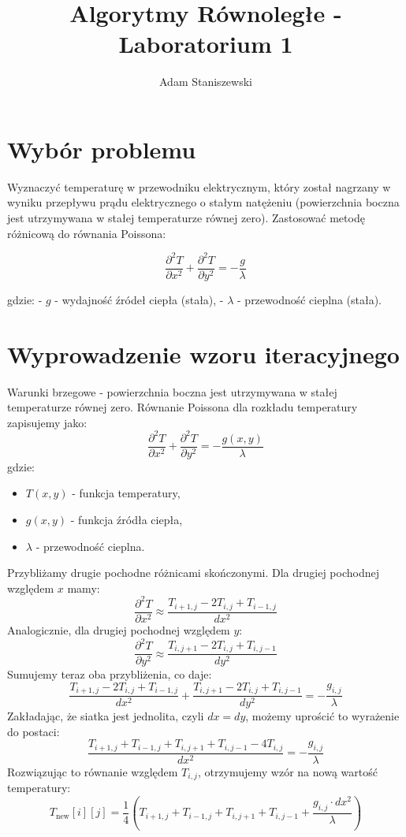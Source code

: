 \documentclass{article}
\title{Algorytmy Równoległe - Laboratorium 1}
\author{Adam Staniszewski}
\begin{document}
\maketitle

\section*{Wybór problemu}
Wyznaczyć temperaturę w przewodniku elektrycznym, który został nagrzany w wyniku przepływu prądu elektrycznego o stałym natężeniu (powierzchnia boczna jest utrzymywana w stałej temperaturze równej zero).
Zastosować metodę różnicową do równania Poissona:

\[
\frac{\partial^2 T}{\partial x^2} + \frac{\partial^2 T}{\partial y^2} = -\frac{g}{\lambda}
\]

gdzie:
- \( g \) - wydajność źródeł ciepła (stała),
- \( \lambda \) - przewodność cieplna (stała).


\section*{Wyprowadzenie wzoru iteracyjnego}
Warunki brzegowe - powierzchnia boczna jest utrzymywana w stałej temperaturze równej zero.
Równanie Poissona dla rozkładu temperatury zapisujemy jako:
\[
\frac{\partial^2 T}{\partial x^2} + \frac{\partial^2 T}{\partial y^2} = -\frac{g(x, y)}{\lambda}
\]
gdzie:
\begin{itemize}
    \item \( T(x, y) \) - funkcja temperatury,
    \item \( g(x, y) \) - funkcja źródła ciepła,
    \item \( \lambda \) - przewodność cieplna.
\end{itemize}
Przybliżamy drugie pochodne różnicami skończonymi. Dla drugiej pochodnej względem \( x \) mamy:
\[
\frac{\partial^2 T}{\partial x^2} \approx \frac{T_{i+1, j} - 2T_{i, j} + T_{i-1, j}}{dx^2}
\]
Analogicznie, dla drugiej pochodnej względem \( y \):
\[
\frac{\partial^2 T}{\partial y^2} \approx \frac{T_{i, j+1} - 2T_{i, j} + T_{i, j-1}}{dy^2}
\]
Sumujemy teraz oba przybliżenia, co daje:
\[
\frac{T_{i+1, j} - 2T_{i, j} + T_{i-1, j}}{dx^2} + \frac{T_{i, j+1} - 2T_{i, j} + T_{i, j-1}}{dy^2} = -\frac{g_{i, j}}{\lambda}
\]
Zakładając, że siatka jest jednolita, czyli \( dx = dy \), możemy uprościć to wyrażenie do postaci:
\[
\frac{T_{i+1, j} + T_{i-1, j} + T_{i, j+1} + T_{i, j-1} - 4T_{i, j}}{dx^2} = -\frac{g_{i, j}}{\lambda}
\]
Rozwiązując to równanie względem \( T_{i, j} \), otrzymujemy wzór na nową wartość temperatury:
\[
T_{\text{new}}[i][j] = \frac{1}{4} \left( T_{i+1, j} + T_{i-1, j} + T_{i, j+1} + T_{i, j-1} + \frac{g_{i, j} \cdot dx^2}{\lambda} \right)
\]
\end{document}
